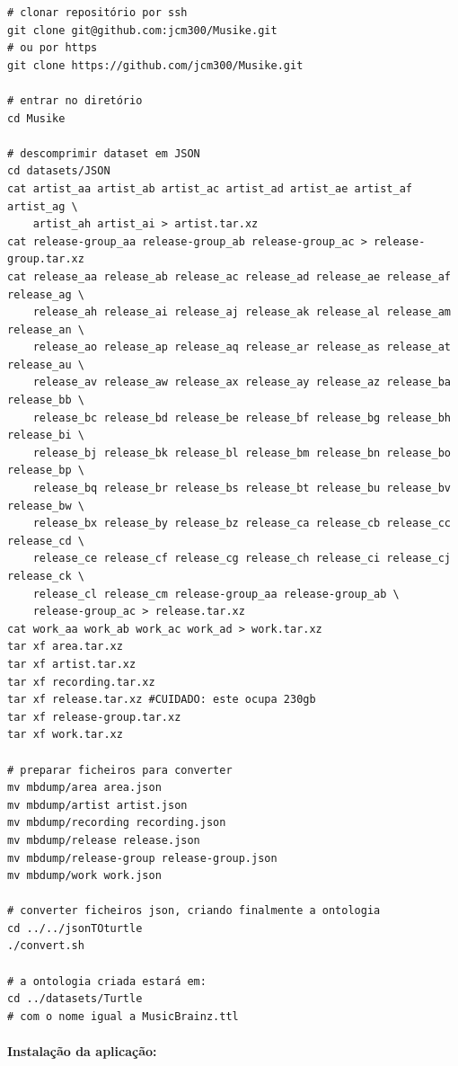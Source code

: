 \documentclass{article}
\begin{document}
\begin{framed}
\begin{verbatim}
# clonar repositório por ssh
git clone git@github.com:jcm300/Musike.git
# ou por https
git clone https://github.com/jcm300/Musike.git

# entrar no diretório
cd Musike

# descomprimir dataset em JSON
cd datasets/JSON
cat artist_aa artist_ab artist_ac artist_ad artist_ae artist_af artist_ag \ 
    artist_ah artist_ai > artist.tar.xz
cat release-group_aa release-group_ab release-group_ac > release-group.tar.xz
cat release_aa release_ab release_ac release_ad release_ae release_af release_ag \ 
    release_ah release_ai release_aj release_ak release_al release_am release_an \
    release_ao release_ap release_aq release_ar release_as release_at release_au \
    release_av release_aw release_ax release_ay release_az release_ba release_bb \
    release_bc release_bd release_be release_bf release_bg release_bh release_bi \
    release_bj release_bk release_bl release_bm release_bn release_bo release_bp \
    release_bq release_br release_bs release_bt release_bu release_bv release_bw \
    release_bx release_by release_bz release_ca release_cb release_cc release_cd \
    release_ce release_cf release_cg release_ch release_ci release_cj release_ck \
    release_cl release_cm release-group_aa release-group_ab \
    release-group_ac > release.tar.xz
cat work_aa work_ab work_ac work_ad > work.tar.xz
tar xf area.tar.xz
tar xf artist.tar.xz
tar xf recording.tar.xz
tar xf release.tar.xz #CUIDADO: este ocupa 230gb
tar xf release-group.tar.xz
tar xf work.tar.xz

# preparar ficheiros para converter
mv mbdump/area area.json
mv mbdump/artist artist.json
mv mbdump/recording recording.json
mv mbdump/release release.json
mv mbdump/release-group release-group.json
mv mbdump/work work.json

# converter ficheiros json, criando finalmente a ontologia
cd ../../jsonTOturtle
./convert.sh

# a ontologia criada estará em:
cd ../datasets/Turtle
# com o nome igual a MusicBrainz.ttl 
\end{verbatim}
\end{framed}

\paragraph{Instalação da aplicação:}\mbox{}\\
\end{document}
